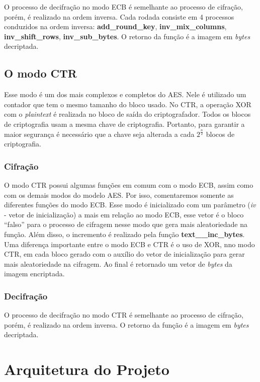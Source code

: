 \documentclass[11pt]{article}
\begin{document}
O processo de decifração no modo ECB é semelhante ao processo de cifração,
porém, é realizado na ordem inversa. Cada rodada consiste em 4 processos
conduzidos na ordem inversa: \textbf{add\_round\_key}, \textbf{inv\_mix\_columns},
\textbf{inv\_shift\_rows}, \textbf{inv\_sub\_bytes}. O retorno da função é a imagem em \emph{bytes}
decriptada.

\subsection{O modo CTR}
\label{sec:org97f4029}

Esse modo é um dos mais complexos e completos do AES. Nele é utilizado um
contador que tem o mesmo tamanho do bloco usado. No CTR, a operação XOR com o
\emph{plaintext} é realizada no bloco de saída do criptografador. Todos os blocos de
criptografia usam a mesma chave de criptografia. Portanto, para garantir a maior
segurança é necessário que a chave seja alterada a cada \(2^\frac{n}{2}\) blocos de
criptografia.

\subsubsection{Cifração}
\label{sec:org653243a}

O modo CTR possui algumas funções em comum com o modo ECB, assim como com os
demais modos do modelo AES. Por isso, comentaremos somente as diferentes funções
do modo ECB. Esse modo é inicializado com um parâmetro
(\emph{iv} - vetor de inicialização) a mais em relação ao modo ECB, esse vetor é o
bloco “falso” para o processo de cifragem nesse modo que gera mais aleatoriedade
na função. Além disso, o incremento é realizado pela função \textbf{text\_\_inc\_bytes}. Uma
diferença importante entre o modo ECB e CTR é o uso de XOR, nno modo CTR, em
cada bloco gerado com o auxílio do vetor de inicialização para gerar mais
aleatoriedade na cifragem.  Ao final é retornado um vetor de \emph{bytes} da imagem
encriptada.

\subsubsection{Decifração}
\label{sec:orgb2ea0cd}

O processo de decifração no modo CTR é semelhante ao processo de cifração,
porém, é realizado na ordem inversa. O retorno da função é a imagem em \emph{bytes}
decriptada.

\section{Arquitetura do Projeto}
\label{sec:org39f0397}
\end{document}
